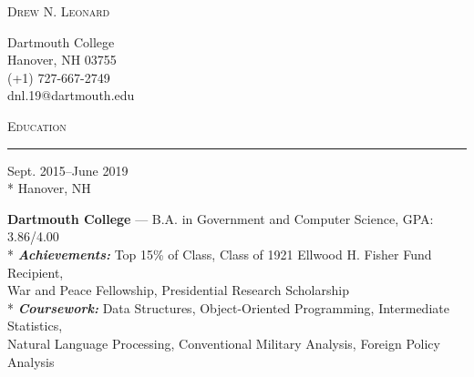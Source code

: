 \documentclass[a4paper,9pt]{article}
\begin{document}
\begin{minipage}[b]{0.70\linewidth}
	{\fontsize{32}{38}\selectfont \textsc{Drew N. Leonard}}
\end{minipage}
\begin{minipage}[b]{0.25\linewidth}
	\begin{flushright}
		\begin{small}
			Dartmouth College
			\\[0.25ex]
			Hanover, NH 03755
			\\[0.25ex]
			(+1) 727-667-2749
			\\[0.25ex]
			dnl.19@dartmouth.edu
			\\[0.25ex]
		\end{small}
	\end{flushright}
\end{minipage}

\vspace*{25pt}
\begin{Large}
	\textsc{Education}
\end{Large}
\vspace*{5pt}
\hrule

\vspace{2ex}	
\begin{minipage}[t]{0.20\linewidth}
	\begin{small}
		\begin{spacing}{1.00}
			\begin{flushright}
				Sept. 2015--June 2019
				\\*
				\vspace*{2.5pt}
				Hanover, NH
			\end{flushright}
		\end{spacing}
	\end{small}
\end{minipage}
\hspace{4mm}
\begin{minipage}[t]{0.75\linewidth}
	\begin{small}
		\begin{spacing}{1.00}
			\begin{flushleft}
				\textbf{Dartmouth College} --- B.A. in Government and Computer Science, GPA: 3.86/4.00
				\\*
				\vspace*{2.5pt} \textit{\textbf{Achievements:}} Top 15\% of Class, Class of 1921 Ellwood H. Fisher Fund Recipient, \\War and Peace Fellowship, Presidential Research Scholarship
				\\*
				\vspace*{2.5pt}
				\textit{\textbf{Coursework:}} Data Structures, Object-Oriented Programming, Intermediate Statistics,
                \\ Natural Language Processing, Conventional Military Analysis, Foreign Policy Analysis
			\end{flushleft}
		\end{spacing}
	\end{small}
\end{minipage}
\end{document}
